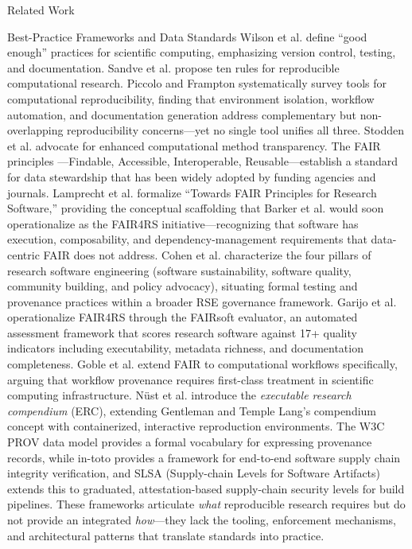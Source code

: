 \documentclass[
  ignorenonframetext,
]{beamer}
\begin{document}
\begin{frame}{Related Work}
\begin{block}{Best-Practice Frameworks and Data Standards}
\protect{}\label{best-practice-frameworks-and-data-standards}
Wilson et al.  define ``good enough'' practices for
scientific computing, emphasizing version control, testing, and
documentation. Sandve et al.  propose ten rules for
reproducible computational research. Piccolo and Frampton
 systematically survey tools for computational
reproducibility, finding that environment isolation, workflow
automation, and documentation generation address complementary but
non-overlapping reproducibility concerns---yet no single tool unifies
all three. Stodden et al.  advocate for
enhanced computational method transparency. The FAIR principles
---Findable, Accessible, Interoperable,
Reusable---establish a standard for data stewardship that has been
widely adopted by funding agencies and journals. Lamprecht et al.
 formalize ``Towards FAIR Principles for
Research Software,'' providing the conceptual scaffolding that Barker et
al.  would soon operationalize as the FAIR4RS
initiative---recognizing that software has execution, composability, and
dependency-management requirements that data-centric FAIR does not
address. Cohen et al.  characterize the four pillars
of research software engineering (software sustainability, software
quality, community building, and policy advocacy), situating formal
testing and provenance practices within a broader RSE governance
framework. Garijo et al.  operationalize
FAIR4RS through the FAIRsoft evaluator, an automated assessment
framework that scores research software against 17+ quality indicators
including executability, metadata richness, and documentation
completeness. Goble et al.  extend FAIR to
computational workflows specifically, arguing that workflow provenance
requires first-class treatment in scientific computing infrastructure.
Nüst et al.  introduce the
\emph{executable research compendium} (ERC), extending Gentleman and
Temple Lang's compendium concept with containerized, interactive
reproduction environments. The W3C PROV data model
 provides a formal vocabulary for expressing
provenance records, while in-toto  provides
a framework for end-to-end software supply chain integrity verification,
and SLSA  (Supply-chain Levels for Software
Artifacts) extends this to graduated, attestation-based supply-chain
security levels for build pipelines. These frameworks articulate
\emph{what} reproducible research requires but do not provide an
integrated \emph{how}---they lack the tooling, enforcement mechanisms,
and architectural patterns that translate standards into practice.
\end{block}


\end{frame}
\end{document}
